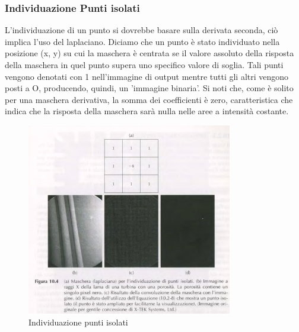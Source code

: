 \documentclass[12pt]{article}
\begin{document}
\subsubsection{Individuazione Punti isolati}
L'individuazione di un punto si dovrebbe basare sulla derivata seconda, ciò implica l'uso del laplaciano. Diciamo che un punto è stato individuato nella posizione (x, y) su cui la maschera è centrata se il valore assoluto della risposta della maschera in quel punto supera uno specifico valore di soglia. Tali punti vengono denotati con 1 nell'immagine di output mentre tutti gli altri vengono posti a O, producendo, quindi, un 'immagine binaria'.
Si noti che, come è solito per una maschera derivativa, la somma dei coefficienti è zero, caratteristica che indica che la risposta della maschera sarà nulla nelle aree a intensità costante.
\begin{figure}[!htb]
    \centering
    \includegraphics[width=0.8\textwidth]{Images/punti.png}
    \caption{Individuazione punti isolati}
\end{figure}
\FloatBarrier
\end{document}
